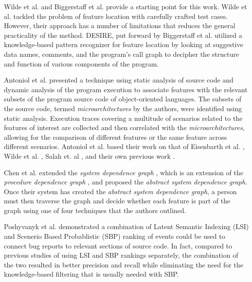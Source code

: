 \label{sec:related}


Wilde et al. \cite{wilde1992locating} and Biggerstaff et al. 
\cite{biggerstaff1994program} provide a starting point for this work. Wilde
et al. tackled the problem of feature location with carefully crafted test
cases. However, their approach has a number of limitations that reduces the
general practicality of the method. DESIRE, 
put forward by Biggerstaff et al. utilized a knowledge-based pattern recognizer
for feature location by looking at suggestive data names, comments, and the 
program's call graph to
decipher the structure and function of various components of the program.

Antoniol et al. \cite{antoniol2006feature}
presented a technique using static analysis of source code and dynamic analysis
of the program execution to associate features with the relevant subsets of the 
program source code of object-oriented languages. The subsets of the source 
code, termed \textit{microarchitectures} by the authors, were identified using 
static analysis. Execution traces covering a multitude of scenarios related to
the features of interest are collected and then correlated with the
\textit{microarchitectures}, allowing for the comparison of different features
or the same feature across different scenarios. Antoniol et al. based their work
on that of Eisenbarth et al. \cite{eisenbarth2003locating}, 
Wilde et al. \cite{wilde1995software}, Salah et. al \cite{salah2004hierarchy},
and their own previous work \cite{antoniol2005feature}.

Chen et al. \cite{chen2000case} extended the \textit{system dependence graph}
\cite{horwitz1990interprocedural} \cite{horwitz1992use}, which
is an extension of the \textit{procedure dependence graph}
\cite{ottenstein1984program}, and proposed the
\textit{abstract system dependence graph}. Once their system has created the
\textit{abstract system dependence graph}, a person must then traverse the graph
and decide whether each feature is part of the graph using one of four 
techniques that the authors outlined.

Poshyvanyk et al. \cite{poshyvanyk2006combining} demonstrated a combination of 
Latent Semantic Indexing (LSI) and Scenerio Based Probablistic (SBP) ranking 
of events could be used
to connect bug reports to relevant sections of source code. In fact, compared
to previous studies of using LSI \cite{marcus2004information} and SBP rankings 
separately, the combination of the two resulted in
better precision and recall while eliminating the need for the knowledge-based
filtering that is usually needed with SBP.

